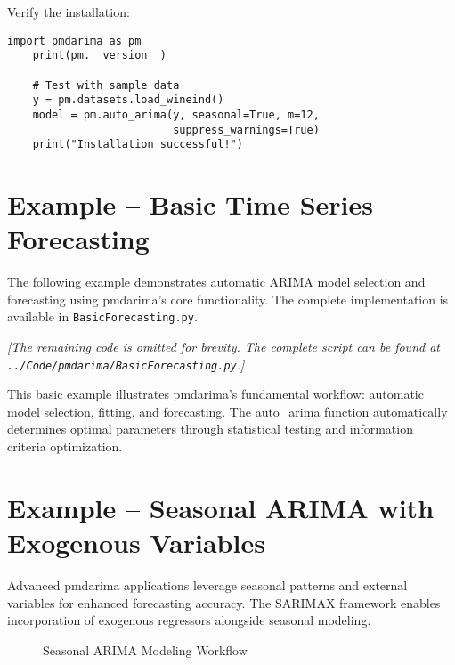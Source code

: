 Verify the installation:

\begin{lstlisting}[language=MyPython, caption={Installation Verification}]
	import pmdarima as pm
	print(pm.__version__)
	
	# Test with sample data
	y = pm.datasets.load_wineind()
	model = pm.auto_arima(y, seasonal=True, m=12, 
	                      suppress_warnings=True)
	print("Installation successful!")
\end{lstlisting}

\section{Example -- Basic Time Series Forecasting}
\label{sec:basic_example}

The following example demonstrates automatic ARIMA model selection and forecasting using pmdarima's core functionality. The complete implementation is available in \texttt{BasicForecasting.py}.



\noindent\textit{[The remaining code is omitted for brevity. The complete script can be found at \texttt{../Code/pmdarima/BasicForecasting.py}.]}

This basic example illustrates pmdarima's fundamental workflow: automatic model selection, fitting, and forecasting. The auto\_arima function automatically determines optimal parameters through statistical testing and information criteria optimization.

\section{Example -- Seasonal ARIMA with Exogenous Variables}
\label{sec:seasonal_example}

Advanced pmdarima applications leverage seasonal patterns and external variables for enhanced forecasting accuracy. The SARIMAX framework enables incorporation of exogenous regressors alongside seasonal modeling.

\clearpage

\begin{figure}[htbp]
	\centering
    
	\caption{Seasonal ARIMA Modeling Workflow}
	\label{fig:seasonal_flow}
\end{figure}

